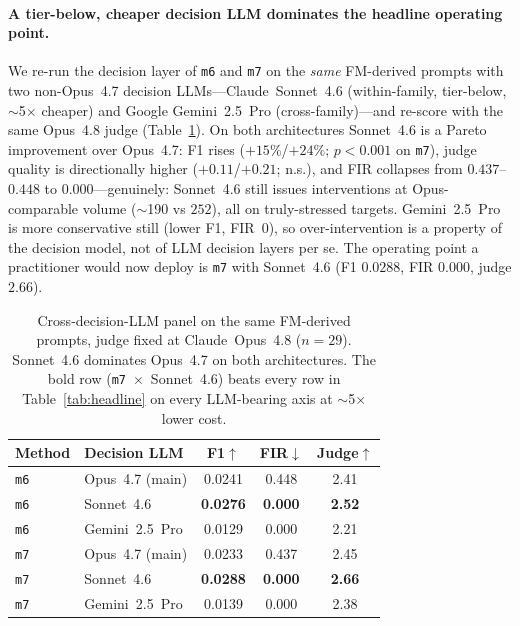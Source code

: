 \paragraph{A tier-below, cheaper decision LLM dominates the headline operating point.}
We re-run the decision layer of \texttt{m6} and \texttt{m7} on the
\emph{same} FM-derived prompts with two non-Opus~4.7 decision
LLMs---Claude~Sonnet~4.6 (within-family, tier-below, $\sim$5$\times$
cheaper) and Google Gemini~2.5~Pro (cross-family)---and re-score
with the same Opus~4.8 judge (Table~\ref{tab:decision-panel}).
On both architectures Sonnet~4.6 is a Pareto improvement over
Opus~4.7: F1 rises ($+15\%$/$+24\%$; $p\!<\!0.001$ on
\texttt{m7}), judge quality is directionally higher
($+0.11$/$+0.21$; n.s.), and FIR collapses from $0.437$--$0.448$
to $0.000$---genuinely: Sonnet~4.6 still issues interventions at
Opus-comparable volume ($\sim$190 vs $252$), all on truly-stressed
targets. Gemini~2.5~Pro is more conservative still (lower F1,
FIR~$0$), so over-intervention is a property of the decision model,
not of LLM decision layers per se. The
operating point a practitioner would now deploy is \texttt{m7}
with Sonnet~4.6 (F1 $0.0288$, FIR $0.000$, judge $2.66$).

\begin{table}[t]
\centering\small
\setlength{\tabcolsep}{4pt}
\begin{tabular}{@{}llccc@{}}
\toprule
Method & Decision LLM & F1$\uparrow$ & FIR$\downarrow$ & Judge$\uparrow$ \\
\midrule
\texttt{m6} & Opus~4.7 (main)  & 0.0241 & 0.448 & 2.41 \\
\texttt{m6} & Sonnet~4.6       & \textbf{0.0276} & \textbf{0.000} & \textbf{2.52} \\
\texttt{m6} & Gemini~2.5~Pro   & 0.0129 & 0.000 & 2.21 \\
\midrule
\texttt{m7} & Opus~4.7 (main)  & 0.0233 & 0.437 & 2.45 \\
\texttt{m7} & Sonnet~4.6       & \textbf{0.0288} & \textbf{0.000} & \textbf{2.66} \\
\texttt{m7} & Gemini~2.5~Pro   & 0.0139 & 0.000 & 2.38 \\
\bottomrule
\end{tabular}
\caption{Cross-decision-LLM panel on the same FM-derived prompts,
judge fixed at Claude~Opus~4.8 ($n\!=\!29$). Sonnet~4.6 dominates
Opus~4.7 on both architectures. The bold row
(\texttt{m7}~$\times$~Sonnet~4.6) beats every row in
Table~\ref{tab:headline} on every LLM-bearing axis at
$\sim$5$\times$ lower cost.}
\label{tab:decision-panel}
\end{table}

